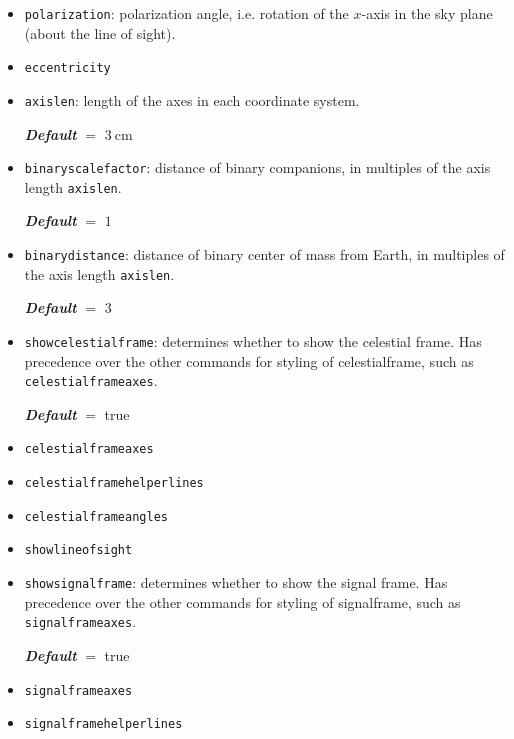 \documentclass[
    DIV=11,
    BCOR=0mm,
    paper=a4,
    fontsize=11pt,
    twoside=false,
    titlepage=true
]{scrartcl}
\newcommand{\code}[1]{\textcolor{codecolor}{\texttt{#1}}}
\newcommand{\defaultval}[1]{%
    {\bfseries\slshape%
    Default} $=$ #1%
}
\begin{document}
\begin{itemize}
    
    \item \code{polarization}: polarization angle, i.e. rotation of the $x$-axis
    in the sky plane (about the line of sight).


    \item \code{eccentricity}


    \item \code{axislen}: length of the axes in each coordinate system.
    
    \defaultval{$\SI{3}{\centi\metre}$}


    \item \code{binaryscalefactor}: distance of binary companions, in multiples
    of the axis length \code{axislen}.
    
    \defaultval{$1$}


    \item \code{binarydistance}: distance of binary center of mass from Earth,
    in multiples of the axis length \code{axislen}.
    
    \defaultval{$3$}




    \item \code{showcelestialframe}: determines whether to show the celestial frame.
    Has precedence over the other commands for styling of celestialframe, such
    as \code{celestialframeaxes}.

    \defaultval{true}


    \item \code{celestialframeaxes}


    \item \code{celestialframehelperlines}


    \item \code{celestialframeangles}


    \item \code{showlineofsight}


    \item \code{showsignalframe}: determines whether to show the signal frame.
    Has precedence over the other commands for styling of signalframe, such
    as \code{signalframeaxes}.

    \defaultval{true}


    \item \code{signalframeaxes}


    \item \code{signalframehelperlines}



\end{itemize}
\end{document}
